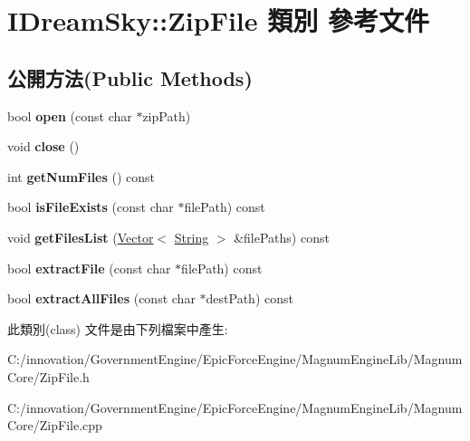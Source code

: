 \hypertarget{class_i_dream_sky_1_1_zip_file}{}\section{I\+Dream\+Sky\+:\+:Zip\+File 類別 參考文件}
\label{class_i_dream_sky_1_1_zip_file}
\subsection*{公開方法(Public Methods)}
\begin{DoxyCompactItemize}
\item 
bool {\bfseries open} (const char $\ast$zip\+Path)\hypertarget{class_i_dream_sky_1_1_zip_file_a93fa349f96a7de789278a07ad2fefe02}{}\label{class_i_dream_sky_1_1_zip_file_a93fa349f96a7de789278a07ad2fefe02}

\item 
void {\bfseries close} ()\hypertarget{class_i_dream_sky_1_1_zip_file_a6bfa8ce114807b28c7e06b682dad27c3}{}\label{class_i_dream_sky_1_1_zip_file_a6bfa8ce114807b28c7e06b682dad27c3}

\item 
int {\bfseries get\+Num\+Files} () const \hypertarget{class_i_dream_sky_1_1_zip_file_a99fc99a34f5858ff581b9ce064203f7c}{}\label{class_i_dream_sky_1_1_zip_file_a99fc99a34f5858ff581b9ce064203f7c}

\item 
bool {\bfseries is\+File\+Exists} (const char $\ast$file\+Path) const \hypertarget{class_i_dream_sky_1_1_zip_file_a1916c879e13dd1aa55ee0c6869ce2743}{}\label{class_i_dream_sky_1_1_zip_file_a1916c879e13dd1aa55ee0c6869ce2743}

\item 
void {\bfseries get\+Files\+List} (\hyperlink{class_i_dream_sky_1_1_vector}{Vector}$<$ \hyperlink{class_i_dream_sky_1_1_string}{String} $>$ \&file\+Paths) const \hypertarget{class_i_dream_sky_1_1_zip_file_a9a8732cbe010433281fb26c8910cd6d0}{}\label{class_i_dream_sky_1_1_zip_file_a9a8732cbe010433281fb26c8910cd6d0}

\item 
bool {\bfseries extract\+File} (const char $\ast$file\+Path) const \hypertarget{class_i_dream_sky_1_1_zip_file_afcba65f7cd0cee67eb61047efe5aac51}{}\label{class_i_dream_sky_1_1_zip_file_afcba65f7cd0cee67eb61047efe5aac51}

\item 
bool {\bfseries extract\+All\+Files} (const char $\ast$dest\+Path) const \hypertarget{class_i_dream_sky_1_1_zip_file_ad9899a35424e65fd276f9c8ee1c9be53}{}\label{class_i_dream_sky_1_1_zip_file_ad9899a35424e65fd276f9c8ee1c9be53}

\end{DoxyCompactItemize}


此類別(class) 文件是由下列檔案中產生\+:\begin{DoxyCompactItemize}
\item 
C\+:/innovation/\+Government\+Engine/\+Epic\+Force\+Engine/\+Magnum\+Engine\+Lib/\+Magnum\+Core/Zip\+File.\+h\item 
C\+:/innovation/\+Government\+Engine/\+Epic\+Force\+Engine/\+Magnum\+Engine\+Lib/\+Magnum\+Core/Zip\+File.\+cpp\end{DoxyCompactItemize}
